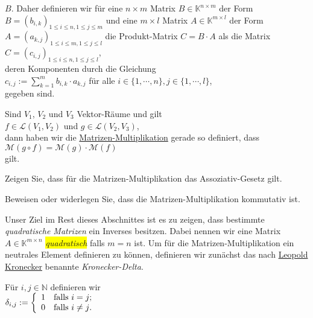 $B$.  Daher definieren wir f\"{u}r eine 
$n \times m$ Matrix $B \in \mathbb{K}^{n \times m}$ der Form $B = (b_{i,k})_{1\leq i \leq n, 1 \leq j \leq m}$ und eine $m \times l$ Matrix
$A \in \mathbb{K}^{m \times l}$ der Form $A = (a_{k,j})_{1\leq i \leq m, 1 \leq j \leq l}$ die Produkt-Matrix $C= B \cdot A$ als die
Matrix
\\[0.2cm]
\hspace*{1.3cm}
$C = (c_{i,j})_{1\leq i \leq n, 1 \leq j \leq l}$, 
\\[0.2cm]
deren Komponenten durch die Gleichung
\\[0.2cm]
\hspace*{1.3cm}
$c_{i,j} := \sum\limits_{k=1}^m b_{i,k} \cdot a_{k,j}$ \quad f\"{u}r alle $i \in \{1,\cdots,n\}, j \in\{1,\cdots,l\}$,
\\[0.2cm]
gegeben sind.

\remark
Sind $V_1$, $V_2$ und $V_3$ Vektor-R\"{a}ume und gilt
\\[0.2cm]
\hspace*{1.3cm}
 $f \in \mathcal{L}(V_1, V_2)$ und $g \in \mathcal{L}(V_2, V_3)$,
\\[0.2cm]
dann haben wir die 
\href{http://de.wikipedia.org/wiki/Matrizenmultiplikation}{Matrizen-Multiplikation} gerade so definiert, dass
\\[0.2cm]
\hspace*{1.3cm}
$\mathcal{M}(g \circ f) = \mathcal{M}(g) \cdot \mathcal{M}(f)$
\\[0.2cm]
gilt.  \eoxs

\exercise
Zeigen Sie, dass f\"{u}r die Matrizen-Multiplikation das Assoziativ-Gesetz gilt.
\eoxs

\exercise
Beweisen oder widerlegen Sie, dass die Matrizen-Multiplikation kommutativ ist.
\eox

Unser Ziel im Rest dieses Abschnittes ist es zu zeigen, dass bestimmte \emph{quadratische Matrizen} ein
Inverses besitzen.  Dabei nennen wir eine Matrix $A \in \mathbb{K}^{m \times n}$ \colorbox{yellow}{\emph{quadratisch}}
falls $m = n$ ist.  Um f\"{u}r die Matrizen-Multiplikation ein neutrales Element definieren zu k\"{o}nnen,
definieren wir zun\"{a}chst das nach 
\href{http://de.wikipedia.org/wiki/Leopold_Kronecker}{Leopold Kronecker} benannte \emph{Kronecker-Delta}.


\begin{Definition}
  F\"{u}r $i,j \in \mathbb{N}$ definieren wir
  \\[0.2cm]
  \hspace*{1.3cm}
  $\delta_{i,j} := \left\{
                  \begin{array}[c]{ll}
                    1 & \mbox{falls $i = j$;} \\
                    0 & \mbox{falls $i \not= j$}.
                  \end{array}
                  \right.
  $
\eoxs
\end{Definition}

